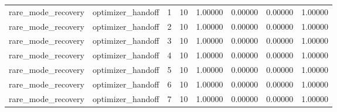 \documentclass{article}
\begin{document}
\begin{table}[tbp]
{\begin{tabular}{llllllll}
rare\_mode\_recovery & optimizer\_handoff & 1 & 10 & 1.00000 & 0.00000 & 0.00000 & 1.00000 \\
rare\_mode\_recovery & optimizer\_handoff & 2 & 10 & 1.00000 & 0.00000 & 0.00000 & 1.00000 \\
rare\_mode\_recovery & optimizer\_handoff & 3 & 10 & 1.00000 & 0.00000 & 0.00000 & 1.00000 \\
rare\_mode\_recovery & optimizer\_handoff & 4 & 10 & 1.00000 & 0.00000 & 0.00000 & 1.00000 \\
rare\_mode\_recovery & optimizer\_handoff & 5 & 10 & 1.00000 & 0.00000 & 0.00000 & 1.00000 \\
rare\_mode\_recovery & optimizer\_handoff & 6 & 10 & 1.00000 & 0.00000 & 0.00000 & 1.00000 \\
rare\_mode\_recovery & optimizer\_handoff & 7 & 10 & 1.00000 & 0.00000 & 0.00000 & 1.00000 \\
\bottomrule
\end{tabular}
}
\end{table}

\clearpage
\end{document}
